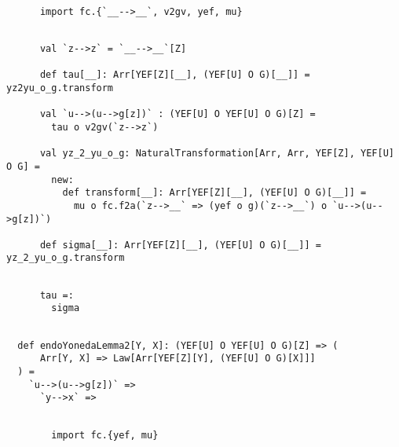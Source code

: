 \documentclass[11pt]{article}
\begin{document}
\vspace{6pt}
\begin{mdframed}[backgroundcolor=lightgray!20] 
\begin{lstlisting}

      import fc.{`__-->__`, v2gv, yef, mu}
\end{lstlisting}
\end{mdframed}
\vspace{6pt}
\begin{mdframed}[backgroundcolor=lightgray!20] 
\begin{lstlisting}

      val `z-->z` = `__-->__`[Z]

      def tau[__]: Arr[YEF[Z][__], (YEF[U] O G)[__]] = yz2yu_o_g.transform

      val `u-->(u-->g[z])` : (YEF[U] O YEF[U] O G)[Z] =
        tau o v2gv(`z-->z`)

      val yz_2_yu_o_g: NaturalTransformation[Arr, Arr, YEF[Z], YEF[U] O G] =
        new:
          def transform[__]: Arr[YEF[Z][__], (YEF[U] O G)[__]] =
            mu o fc.f2a(`z-->__` => (yef o g)(`z-->__`) o `u-->(u-->g[z])`)

      def sigma[__]: Arr[YEF[Z][__], (YEF[U] O G)[__]] = yz_2_yu_o_g.transform
\end{lstlisting}
\end{mdframed}
\vspace{6pt}
\begin{mdframed}[backgroundcolor=lightgray!20] 
\begin{lstlisting}

      tau =:
        sigma

\end{lstlisting}
\end{mdframed}
\vspace{6pt}
\begin{mdframed}[backgroundcolor=lightgray!20] 
\begin{lstlisting}

  def endoYonedaLemma2[Y, X]: (YEF[U] O YEF[U] O G)[Z] => (
      Arr[Y, X] => Law[Arr[YEF[Z][Y], (YEF[U] O G)[X]]]
  ) =
    `u-->(u-->g[z])` =>
      `y-->x` =>
\end{lstlisting}
\end{mdframed}
\vspace{6pt}
\begin{mdframed}[backgroundcolor=lightgray!20] 
\begin{lstlisting}

        import fc.{yef, mu}
\end{lstlisting}
\end{mdframed}
\end{document}
